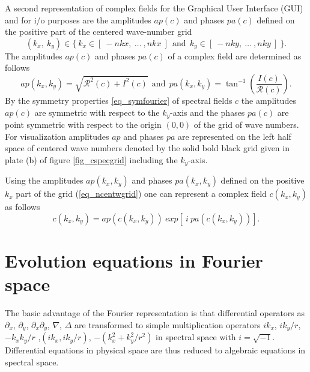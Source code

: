 A second representation of complex fields for the Graphical User Interface 
(GUI) and for i/o purposes are the amplitudes $ap(c)$ and phases $pa(c)$  
defined on the positive part of the centered wave-number grid 
\begin{equation} \label{eq_centwgrid}
   (k_{x},\ k_{y}) \in  
   \{\ k_{x} \in [\ -nkx, \ \dots \ ,nkx \ ] 
    \ \ \mbox{and} \ \ 
       k_{y} \in [\ -nky, \ \dots \ ,nky \ ] \ \}.
\end{equation}
The amplitudes $ap(c)$ and phases $pa(c)$ of a complex field are determined
as follows
\begin{equation} \label{eq_c2amppha}
   ap(k_{x},k_{y}) = \sqrt{\mathcal{R}^{2}(c) + I^{2}(c)}
   \ \ \mbox{and} \ \ 
   pa(k_{x},k_{y}) = \tan^{-1}(\frac{I(c)}{\mathcal{R}(c)}).
\end{equation}
By the symmetry properties \ref{eq_symfourier} of spectral fields $c$
the amplitudes $ap(c)$ are symmetric with respect to the $k_{y}$-axis
and the phases $pa(c)$ are point symmetric with respect to the origin
$(0,0)$ of the grid of wave numbers. For visualization amplitudes $ap$
and phases $pa$ are represented on the left half space of centered
wave numbers denoted by the solid bold black grid given in plate (b)
of figure \ref{fig_cspecgrid} including the $k_{y}$-axis.

Using the amplitudes $ap(k_{x},k_{y})$ and phases $pa(k_{x},k_{y})$ 
defined on the positive $k_{x}$ part of the grid (\ref{eq_ncentwgrid}) 
one can represent a complex field $c(k_{x},k_{y})$ as follows
\begin{equation} \label{eq_amppha2c}
   c(k_{x},k_{y}) = ap(c(k_{x},k_{y})) \ 
       exp \left[ \ i \ pa(c(k_{x},k_{y})) \right].
\end{equation} 
%
\section{Evolution equations in Fourier space}
\label{sec_evolfourier}
%
The basic advantage of the Fourier representation is that
differential operators as $\partial_{x}$,
$\partial_{y}$, $\partial_{x} \partial_{y}$, $\nabla$, $\Delta$
are transformed to simple multiplication operators
$i k_{x}$, $i k_{y}/r$, $- k_{x} k_{y}/r$ ,$(i k_{x},i k_{y}/r)$, 
$-(k_{x}^{2} + k_{y}^{2}/r^{2})$ in spectral space with $i = \sqrt{-1}$.
Differential equations in physical space are thus reduced to algebraic 
equations in spectral space.

